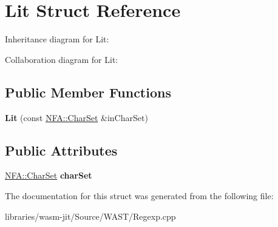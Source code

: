 \hypertarget{struct_lit}{}\section{Lit Struct Reference}
\label{struct_lit}


Inheritance diagram for Lit\+:


Collaboration diagram for Lit\+:
\subsection*{Public Member Functions}
\begin{DoxyCompactItemize}
\item 
\mbox{\label{struct_lit_aa2afbe5f4ab488ce9801449562a642a1}} 
{\bfseries Lit} (const \mbox{\hyperlink{struct_dense_static_int_set}{N\+F\+A\+::\+Char\+Set}} \&in\+Char\+Set)
\end{DoxyCompactItemize}
\subsection*{Public Attributes}
\begin{DoxyCompactItemize}
\item 
\mbox{\label{struct_lit_aca99fb32a7aec842b4e10b436fc61fb5}} 
\mbox{\hyperlink{struct_dense_static_int_set}{N\+F\+A\+::\+Char\+Set}} {\bfseries char\+Set}
\end{DoxyCompactItemize}


The documentation for this struct was generated from the following file\+:\begin{DoxyCompactItemize}
\item 
libraries/wasm-\/jit/\+Source/\+W\+A\+S\+T/Regexp.\+cpp\end{DoxyCompactItemize}

